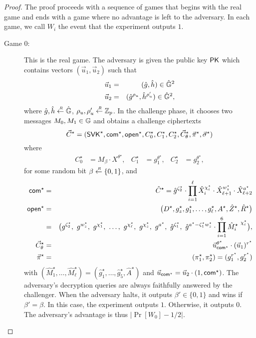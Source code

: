 \begin{proof}
  The proof proceeds with a sequence of games that begins with the real game and ends with a game where no advantage is left to the adversary. In each game, we call $W_i$ the event that the experiment outputs $1$. 


  \begin{description}
  \item[\textsf{Game} $0$:] This is the real game. The adversary is given the public key $\mathsf{PK}$ which contains 
    vectors 
    $(\vec{u}_1, \vec{u}_2)$ such that
    \begin{eqnarray} \label{vec-PK} 
      \vec{u}_1 &=& (\hat{g}, \hat{h}) \in \hat{\mathbb{G}}^2  \\ \nonumber 
      \vec{u}_2 &=&  (\hat{g}^{\rho_u}, \hat{h}^{\rho_u'}) \in \hat{\mathbb{G}}^2,
    \end{eqnarray}
    where $\hat{g},\hat{h} \stackrel{{\scriptscriptstyle \mkern4mu R}}{\gets} \hat{\mathbb{G}}$,  $\rho_u,\rho_u' \stackrel{{\scriptscriptstyle \mkern4mu R}}{\gets} \mathbb{Z}_p$.
    In the challenge phase, 
    it chooses two messages $M_0,M_1 \in \mathbb{G}$ and obtains a challenge ciphertexts 
    $$  \vec{C}^\star = (\mathsf{SVK}^\star, \mathsf{com}^\star, \mathsf{open}^\star, C_0^\star, C_1^\star, C_2^\star, \vec{C}_{\theta}^\star, \vec{\pi}^\star, \vec{\sigma}^\star)  $$
    where 
    \begin{align*}
      C_0^\star &= M_{\beta} \cdot X^{\theta^\star}, & C_1^\star &= g_1^{\theta^\star}, & C_2^\star &= g_2^{\theta^\star},
    \end{align*}
    for some random bit $\beta \stackrel{{\scriptscriptstyle \mkern4mu R}}{\gets} \{0,1\}$, and 
    \begin{eqnarray*}
      \mathsf{com}^\star  &=& \hat{C}^\star  = \hat{g}^{\zeta_2^\star} \cdot \prod_{i = 1}^{\ell }\hat{X}_i^{\chi_i^\star } \cdot \hat{X}_{\ell+1}^{w_z^\star} \cdot \hat{X}_{\ell+2}^{a^\star}  \\
      \mathsf{open}^\star &=& \big( D^\star , g_z^\star, g_1^\star, \dots, g_\ell^\star, A^\star  , \hat{Z}^\star, \hat{R}^\star \big)  \\ 
      & =& \big(  g^{\zeta_2^\star },~ g^{w_z^\star}, ~ g^{\chi_1^\star}, ~\ldots , ~ g^{\chi_\ell^\star} , ~ g^{\chi_z^\star} , ~ g^{a^\star}, ~ 		 
      \hat{g}^{\zeta_1^\star} ,  ~\hat{g}^{a^\star-\zeta_1^\star w_z^\star }  \cdot  \prod_{i=1}^{6} {\hat{M}_i^\star~ }^{\chi_i^\star} 
      \big), \\
      \vec{C}_{\theta}^\star &=& \vec{u}_{\mathsf{com}^\star}^{\theta^\star} \cdot (\vec{u}_1)^{r^\star}\\
      \vec{\pi}^\star &=& (\pi_1^\star,\pi_2^\star) =(g_1^{r^\star},g_2^{r^\star}) 
    \end{eqnarray*}
    with $(\hat{M}_1^\star,\ldots,\hat{M}_\ell^\star)=(\hat{g}_1^\star,\ldots,\hat{g}_5^\star,\hat{A}^\star) $ and 
    $\vec{u}_{\mathsf{com}^\star} = \vec{u}_2\cdot (1, \mathsf{com}^\star)$.
    \indent The adversary's decryption queries are always faithfully answered by the challenger. When the adversary halts, it outputs   
    $\beta' \in \{0,1\}$ and wins if $\beta' =\beta$. In this case, the experiment outputs $1$. Otherwise, it outputs $0$.  
    The adversary's advantage is thus $|\Pr[W_0]-1/2|$. \smallskip \smallskip 


\end{description}
\end{proof}
